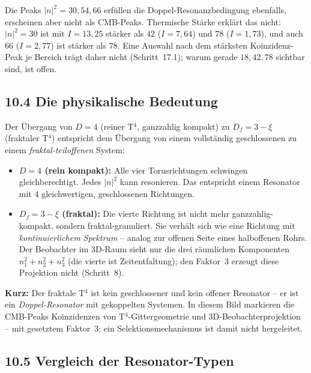 Die Peaks $|n|^2 = 30, 54, 66$ erfüllen die Doppel-Resonanzbedingung
ebenfalls, erscheinen aber nicht als CMB-Peaks. Thermische Stärke erklärt
das nicht: $|n|^2 = 30$ ist mit $I = 13{,}25$ stärker als $42$ ($I = 7{,}64$)
und $78$ ($I = 1{,}73$), und auch $66$ ($I = 2{,}77$) ist stärker als $78$.
Eine Auswahl nach dem stärksten Koinzidenz-Peak je Bereich trägt daher nicht
(Schritt~17.1); warum gerade $18, 42, 78$ sichtbar sind, ist offen.

\subsection*{10.4 Die physikalische Bedeutung}

Der Übergang von $D = 4$ (reiner T$^4$, ganzzahlig kompakt) zu
$D_f = 3 - \xi$ (fraktaler T$^4$) entspricht dem Übergang von einem
vollständig geschlossenen zu einem \emph{fraktal-teiloffenen} System:

\begin{itemize}
  \item \textbf{$D = 4$ (rein kompakt):} Alle vier Torusrichtungen
        schwingen gleichberechtigt. Jedes $|n|^2$ kann resonieren.
        Das entspricht einem Resonator mit $4$ gleichwertigen,
        geschlossenen Richtungen.

  \item \textbf{$D_f = 3 - \xi$ (fraktal):} Die vierte Richtung ist
        nicht mehr ganzzahlig-kompakt, sondern fraktal-granuliert.
        Sie verhält sich wie eine Richtung mit \emph{kontinuierlichem
        Spektrum} -- analog zur offenen Seite eines halboffenen Rohrs.
        Der Beobachter im 3D-Raum sieht nur die drei räumlichen
        Komponenten $n_1^2+n_2^2+n_3^2$ (die vierte ist Zeitentfaltung);
        den Faktor~3 erzeugt diese Projektion nicht (Schritt~8).
\end{itemize}

\textbf{Kurz:} Der fraktale T$^4$ ist kein geschlossener und kein
offener Resonator -- er ist ein \emph{Doppel-Resonator} mit gekoppelten
Systemen. In diesem Bild markieren die CMB-Peaks Koinzidenzen von
T$^4$-Gittergeometrie und 3D-Beobachterprojektion -- mit gesetztem
Faktor~3; ein Selektionsmechanismus ist damit nicht hergeleitet.

\subsection*{10.5 Vergleich der Resonator-Typen}

